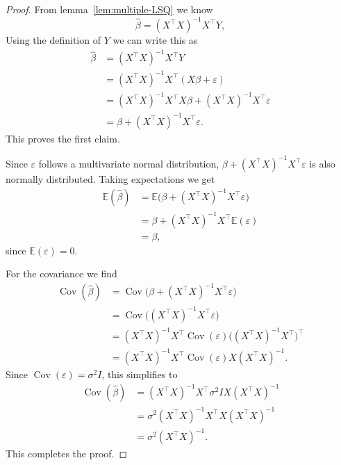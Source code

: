 \documentclass[
  a4paper,
]{article}
\theoremstyle{definition}
\theoremstyle{definition}
\theoremstyle{definition}
\theoremstyle{definition}
\theoremstyle{remark}
\begin{document}
\begin{proof}
From lemma~\ref{lem:multiple-LSQ} we know
\begin{equation*}
  \hat\beta
  = (X^\top X)^{-1} X^\top Y,
\end{equation*}
Using the definition of \(Y\) we can write this as
\begin{align*}
  \hat\beta
  &= (X^\top X)^{-1} X^\top Y \\
  &= (X^\top X)^{-1} X^\top (X\beta + \varepsilon) \\
  &= (X^\top X)^{-1} X^\top X \beta + (X^\top X)^{-1} X^\top \varepsilon\\
  &= \beta + (X^\top X)^{-1} X^\top \varepsilon.
\end{align*}
This proves the first claim.

Since \(\varepsilon\) follows a multivariate normal distribution,
\(\beta + (X^\top X)^{-1} X^\top \varepsilon\) is also normally distributed.
Taking expectations we get
\begin{align*}
  \mathbb{E}(\hat\beta)
  &= \mathbb{E}\bigl( \beta + (X^\top X)^{-1} X^\top \varepsilon\bigr) \\
  &= \beta + (X^\top X)^{-1} X^\top \mathbb{E}(\varepsilon) \\
  &= \beta,
\end{align*}
since \(\mathbb{E}(\varepsilon) = 0\).

For the covariance we find
\begin{align*}
  \mathop{\mathrm{Cov}}(\hat\beta)
  &= \mathop{\mathrm{Cov}}\bigl( \beta + (X^\top X)^{-1} X^\top \varepsilon\bigr) \\
  &= \mathop{\mathrm{Cov}}\bigl( (X^\top X)^{-1} X^\top \varepsilon\bigr) \\
  &= (X^\top X)^{-1} X^\top \mathop{\mathrm{Cov}}(\varepsilon) \bigl( (X^\top X)^{-1} X^\top \bigr)^\top \\
  &= (X^\top X)^{-1} X^\top \mathop{\mathrm{Cov}}(\varepsilon) X (X^\top X)^{-1}.
\end{align*}
Since \(\mathop{\mathrm{Cov}}(\varepsilon) = \sigma^2 I\), this simplifies to
\begin{align*}
  \mathop{\mathrm{Cov}}(\hat\beta)
  &= (X^\top X)^{-1} X^\top \sigma^2 I X (X^\top X)^{-1} \\
  &= \sigma^2 (X^\top X)^{-1} X^\top X (X^\top X)^{-1} \\
  &= \sigma^2 (X^\top X)^{-1}.
\end{align*}
This completes the proof.
\end{proof}
\end{document}
